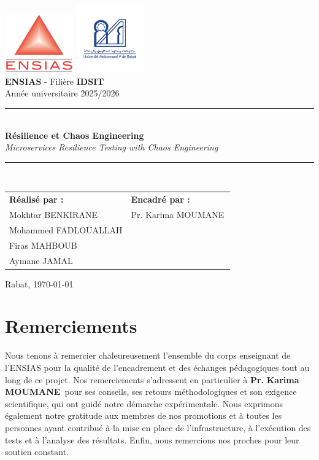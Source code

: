 \documentclass[a4paper,12pt,twoside]{report}
\newcommand{\titre}{Résilience et Chaos Engineering}
\newcommand{\encadrant}{Pr.\,\,Karima MOUMANE\,}
\newcommand{\filiere}{IDSIT}
\newcommand{\ecole}{ENSIAS}
\begin{document}
\begin{titlepage}
\begin{center}
\includegraphics[width=0.22\textwidth]{ensias}\hfill
\includegraphics[width=0.22\textwidth]{um5}\\[1.5cm]

{\Large \textbf{\ecole} - Filière \textbf{\filiere}}\\[0.6cm]
{\large Année universitaire 2025/2026}\\[1.5cm]

\rule{\textwidth}{1pt}\\[0.4cm]
{\LARGE \textbf{\titre}}\\[0.1cm]
{\large \textit{Microservices Resilience Testing with Chaos Engineering}}\\[0.4cm]
\rule{\textwidth}{1pt}\\[1.4cm]

\begin{tabular}{p{}p{}}
\textbf{Réalisé par :} & \textbf{Encadré par :}\\
Mokhtar BENKIRANE & \encadrant\\
Mohammed FADLOUALLAH & \\
Firas MAHBOUB & \\
Aymane JAMAL & \\
\end{tabular}

\vfill
Rabat, \today
\end{center}
\end{titlepage}

\chapter*{Remerciements}

Nous tenons à remercier chaleureusement l'ensemble du corps enseignant de l'ENSIAS pour la qualité de l'encadrement et des échanges pédagogiques tout au long de ce projet. 
Nos remerciements s'adressent en particulier à \textbf{\encadrant} pour ses conseils, ses retours méthodologiques et son exigence scientifique, qui ont guidé notre démarche expérimentale.
Nous exprimons également notre gratitude aux membres de nos promotions et à toutes les personnes ayant contribué à la mise en place de l'infrastructure, à l'exécution des tests et à l'analyse des résultats. 
Enfin, nous remercions nos proches pour leur soutien constant.
\end{document}
